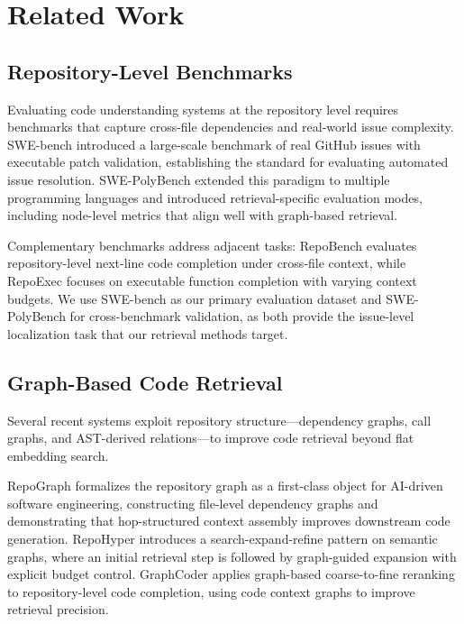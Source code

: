 \section{Related Work}
\label{sec:related_work}

\subsection{Repository-Level Benchmarks}
\label{sec:rw_benchmarks}

Evaluating code understanding systems at the repository level requires benchmarks that capture cross-file dependencies and real-world issue complexity. SWE-bench \citep{swebench2024} introduced a large-scale benchmark of real GitHub issues with executable patch validation, establishing the standard for evaluating automated issue resolution. SWE-PolyBench \citep{swepolybench2025} extended this paradigm to multiple programming languages and introduced retrieval-specific evaluation modes, including node-level metrics that align well with graph-based retrieval.

Complementary benchmarks address adjacent tasks: RepoBench \citep{repobench2024} evaluates repository-level next-line code completion under cross-file context, while RepoExec \citep{repoexec2024} focuses on executable function completion with varying context budgets. We use SWE-bench as our primary evaluation dataset and SWE-PolyBench for cross-benchmark validation, as both provide the issue-level localization task that our retrieval methods target.

\subsection{Graph-Based Code Retrieval}
\label{sec:rw_graph_retrieval}

Several recent systems exploit repository structure---dependency graphs, call graphs, and AST-derived relations---to improve code retrieval beyond flat embedding search.

RepoGraph \citep{repograph2024} formalizes the repository graph as a first-class object for AI-driven software engineering, constructing file-level dependency graphs and demonstrating that hop-structured context assembly improves downstream code generation. RepoHyper \citep{repohyper2024} introduces a search-expand-refine pattern on semantic graphs, where an initial retrieval step is followed by graph-guided expansion with explicit budget control. GraphCoder \citep{graphcoder2024} applies graph-based coarse-to-fine reranking to repository-level code completion, using code context graphs to improve retrieval precision.

